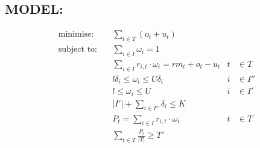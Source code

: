 \documentclass[12pt]{report}
\begin{document}
\subsection*{MODEL:}
\begin{align*}
    \text{minimise:}   \quad       &\sum_{t \in T} (o_t + u_t)                                 & & \\
    \text{subject to:} \quad       &\sum_{i \in I} \omega_i = 1                                        & &               \tag{1} \label{cst:1} \\
                                  &\sum_{i \in I} r_{i,t}\cdot\omega_i = rm_t + o_t - u_t              &t &\in T       \tag{2} \label{cst:2} \\
                                  &l\delta_{i} \leq \omega_{i} \leq U\delta_{i}          &i &\in I''     \tag{3} \label{cst:3} \\
                                  &l \leq \omega_{i} \leq U                                   &i &\in I'      \tag{4} \label{cst:4} \\
                                  &|I'| + \sum_{i \in I''} \delta_{i} \leq K                       &  &             \tag{5} \label{cst:5} \\
                                  &P_t = \sum_{i \in I} r_{i,t}\cdot\omega_i                           &t &\in T       \tag{6} \label{cst:6} \\
                                  &\sum_{t \in T} \frac{P_t}{|T|} \geq T'                                 &  &              \tag{7} \label{cst:7} \\
\end{align*}
\end{document}
